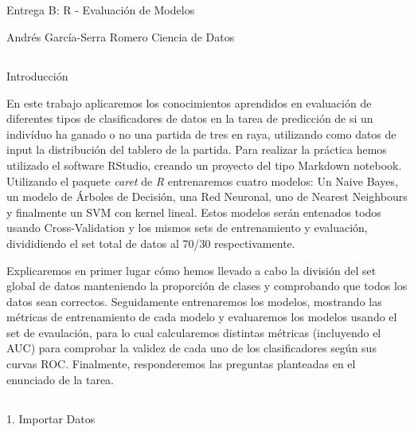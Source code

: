 \documentclass[
]{article}
\author{}
\date{\vspace{-2.5em}}
\begin{document}
\subsection{}\label{section}

\subsection{}\label{section-1}

Entrega B: R - Evaluación de Modelos

Andrés García-Serra Romero Ciencia de Datos

\subsection{}\label{section-2}

Introducción

En este trabajo aplicaremos los conocimientos aprendidos en evaluación
de diferentes tipos de clasificadores de datos en la tarea de predicción
de si un indivíduo ha ganado o no una partida de tres en raya,
utilizando como datos de input la distribución del tablero de la
partida. Para realizar la práctica hemos utilizado el software RStudio,
creando un proyecto del tipo Markdown notebook. Utilizando el paquete
\emph{caret} de \emph{R} entrenaremos cuatro modelos: Un Naive Bayes, un
modelo de Árboles de Decisión, una Red Neuronal, uno de Nearest
Neighbours y finalmente un SVM con kernel lineal. Estos modelos serán
entenados todos usando Cross-Validation y los mismos sets de
entrenamiento y evaluación, divididiendo el set total de datos al 70/30
respectivamente.

Explicaremos en primer lugar cómo hemos llevado a cabo la división del
set global de datos manteniendo la proporción de clases y comprobando
que todos los datos sean correctos. Seguidamente entrenaremos los
modelos, mostrando las métricas de entrenamiento de cada modelo y
evaluaremos los modelos usando el set de evaulación, para lo cual
calcularemos distintas métricas (incluyendo el AUC) para comprobar la
validez de cada uno de los clasificadores según sus curvas ROC.
Finalmente, responderemos las preguntas planteadas en el enunciado de la
tarea.

\subsection{}\label{section-3}

1. Importar Datos
\end{document}
